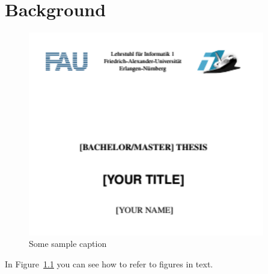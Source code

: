 \documentclass[10pt,twoside,a4paper,bibliography=totoc]{scrbook}
\begin{document}
\chapter{Background}
\label{sec:background}

\blindtext[3][2]

\begin{figure}[ht]
	\centering
	\includegraphics[width=0.92\textwidth]{screenshot}
	\caption{Some sample caption}
	\label{fig:cbc_enc}
\end{figure}


In Figure~\ref{fig:cbc_enc} you can see how to refer to figures in text. \blindtext{}
\end{document}
